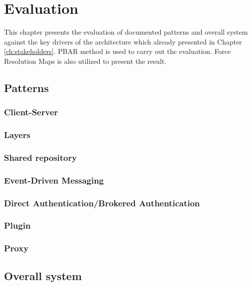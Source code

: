 
\clearpage
\chapter{Evaluation}
\label{ch:evaluation}
This chapter presents the evaluation of documented patterns and overall system
against the key drivers of the architecture which already presented in Chapter
\ref{ch:stakeholders}. PBAR\cite{pbar} method is used to carry out the
evaluation. Force Resolution Maps is also utilized to present the result.

\section{Patterns}
\subsection{Client-Server}
\subsection{Layers}
\subsection{Shared repository}
\subsection{Event-Driven Messaging}
\subsection{Direct Authentication/Brokered Authentication}
\subsection{Plugin}
\subsection{Proxy}

\section{Overall system}
